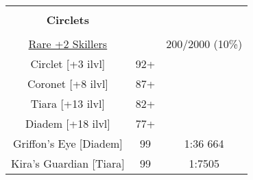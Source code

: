 \begin{center}
\begin{tabular}{|c|c|c|}
	& & \\
	\textbf{Circlets} & & \\
	& & \\

	\hline
	\underline{Rare +2 Skillers} & & 200/2000 (10\%) \\
	Circlet [+3 ilvl] & 92+ & \\
	Coronet [+8 ilvl] & 87+ & \\
	Tiara [+13 ilvl] & 82+ & \\
	Diadem [+18 ilvl] & 77+ & \\
	\hline
	Griffon's Eye [Diadem] & 99 & 1:36 664 \\
	\hline
	Kira's Guardian [Tiara] & 99 & 1:7505 \\
	\hline

	\end{tabular}
\end{center}

